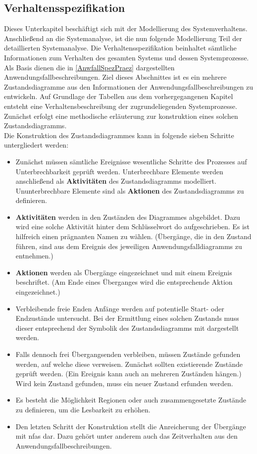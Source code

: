 \documentclass[../../../Bachelorarbeit.tex]{subfiles}
\begin{document}
\subsection{Verhaltensspezifikation}
Dieses Unterkapitel beschäftigt sich mit der Modellierung des Systemverhaltens. Anschließend an die Systemanalyse, ist die nun folgende Modellierung Teil der detaillierten Systemanalyse. Die Verhaltensspezifikation beinhaltet sämtliche Informationen zum Verhalten des gesamten Systems und dessen Systemprozesse. Als Basis dienen die in \autoref{AnwfallSpezPraez} dargestellten Anwendungsfallbeschreibungen. Ziel dieses Abschnittes ist es ein \bzw mehrere Zustandsdiagramme aus den Informationen der Anwendungsfallbeschreibungen zu entwickeln. Auf Grundlage der Tabellen aus dem vorhergegangenen Kapitel entsteht eine Verhaltensbeschreibung der zugrundeliegenden Systemprozesse. Zunächst erfolgt eine methodische erläuterung zur konstruktion eines solchen Zustandsdiagramms. \\
Die Konstruktion des Zustandsdiagrammes kann in folgende sieben Schritte untergliedert werden:
\begin{itemize}
    \item Zunächst müssen sämtliche Ereignisse \bzw wesentliche Schritte des Prozesses auf Unterbrechbarkeit geprüft werden. Unterbrechbare Elemente werden anschließend als \textbf{Aktivitäten} des Zustandsdiagramms modelliert. Ununterbrechbare Elemente sind als \textbf{Aktionen} des Zustandsdiagramms zu definieren.
    \item \textbf{Aktivitäten} werden in den Zuständen des Diagrammes abgebildet. Dazu wird eine solche Aktivität hinter dem Schlüsselwort \glqq do\grqq{} aufgeschrieben. Es ist hilfreich einen prägnanten Namen zu wählen. (Übergänge, die in den Zustand führen, sind aus dem Ereignis des jeweiligen Anwendungsfalldiagramms zu entnehmen.)
    \item \textbf{Aktionen} werden als Übergänge eingezeichnet und mit einem Ereignis beschriftet. (Am Ende eines Überganges wird die entsprechende Aktion eingezeichnet.)
    \item Verbleibende freie Enden \bzw Anfänge werden auf potentielle Start- oder Endzustände untersucht. Bei der Ermittlung eines solchen Zustands muss dieser entsprechend der Symbolik des Zustandsdiagramms mit dargestellt werden.
    \item Falls dennoch frei Übergangsenden verbleiben, müssen Zustände gefunden werden, auf welche diese verweisen. Zunächst sollten existierende Zustände geprüft werden. (Ein Ereignis kann auch an mehreren Zuständen hängen.) Wird kein Zustand gefunden, muss ein neuer Zustand erfunden werden.
    \item Es besteht die Möglichkeit Regionen oder auch zusammengesetzte Zustände zu definieren, um die Lesbarkeit zu erhöhen.
    \item Den letzten Schritt der Konstruktion stellt die Anreicherung der Übergänge mit \acp{nfa} dar. Dazu gehört unter anderem auch das Zeitverhalten aus den Anwendungsfallbeschreibungen. 
\end{itemize}
\end{document}
